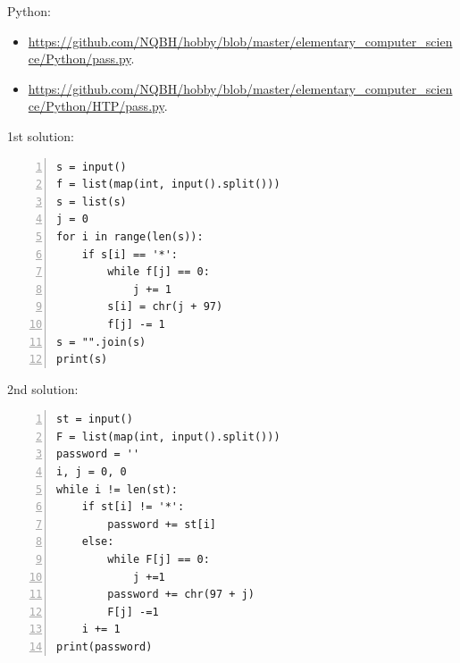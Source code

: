 \documentclass{article}
\begin{document}
Python:
\begin{itemize}
	\item \url{https://github.com/NQBH/hobby/blob/master/elementary_computer_science/Python/pass.py}.
	\item \url{https://github.com/NQBH/hobby/blob/master/elementary_computer_science/Python/HTP/pass.py}.
\end{itemize} 
\begin{multicols}{2}
1st solution:
\begin{Verbatim}[numbers=left,xleftmargin=5mm]
s = input()
f = list(map(int, input().split()))
s = list(s)
j = 0
for i in range(len(s)):
    if s[i] == '*':
        while f[j] == 0:
            j += 1
        s[i] = chr(j + 97)
        f[j] -= 1
s = "".join(s)
print(s)
\end{Verbatim}

\columnbreak
2nd solution:
\begin{Verbatim}[numbers=left,xleftmargin=5mm]
st = input()
F = list(map(int, input().split()))
password = ''
i, j = 0, 0
while i != len(st):
    if st[i] != '*':
        password += st[i]
    else:
        while F[j] == 0:
            j +=1
        password += chr(97 + j)
        F[j] -=1
    i += 1
print(password)
\end{Verbatim}
\end{multicols}
\end{document}
